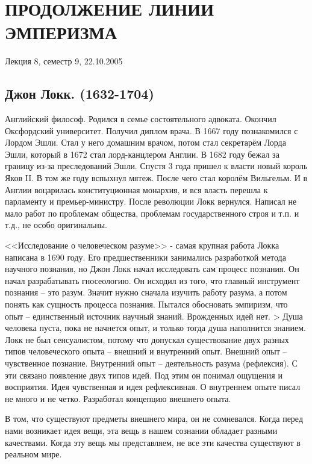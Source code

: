 



\section{ПРОДОЛЖЕНИЕ ЛИНИИ ЭМПЕРИЗМА}
Лекция 8, семестр 9, 22.10.2005
\subsection{Джон Локк. (1632-1704)}

Английский философ. Родился в семье состоятельного адвоката. Окончил Оксфордский университет. Получил диплом врача. В 1667 году познакомился с Лордом Эшли. Стал у него домашним врачом, потом стал секретарём Лорда Эшли, который в 1672 стал лорд-канцлером Англии. В 1682 году бежал за границу из-за преследований Эшли. Спустя 3 года пришел к власти новый король Яков II. В том же году вспыхнул мятеж. После чего стал королём Вильгельм. И в Англии воцарилась конституционная монархия, и вся власть перешла к парламенту и премьер-министру. После революции Локк вернулся. Написал не мало работ по проблемам общества, проблемам государственного строя и т.п. и т.д., не особо оригинальны.

<<Исследование о человеческом разуме>> - самая крупная работа Локка написана в 1690 году. Его предшественники занимались разработкой метода научного познания, но Джон Локк начал исследовать сам процесс познания. Он начал разрабатывать гносеологию. Он исходил из того, что главный инструмент познания – это разум. Значит нужно сначала изучить работу разума, а потом понять как сущность процесса познания. Пытался обосновать эмпиризм, что опыт – единственный источник научный знаний. Врожденных идей нет. > Душа человека пуста, пока не начнется опыт, и только тогда душа наполнится знанием. Локк не был сенсуалистом, потому что допускал существование двух разных типов человеческого опыта – внешний и внутренний опыт. Внешний опыт – чувственное познание. Внутренний опыт – деятельность разума (рефлексия). С эти связано появление двух типов идей. Под этим он понимал ощущения и восприятия. Идея чувственная и идея рефлексивная. О внутреннем опыте писал не много и не четко. Разработал концепцию внешнего опыта.

В том, что существуют предметы внешнего мира, он не сомневался. Когда перед нами возникает идея вещи, эта вещь в нашем сознании обладает разными качествами. Когда эту вещь мы представляем, не все эти качества существуют в реальном мире.

